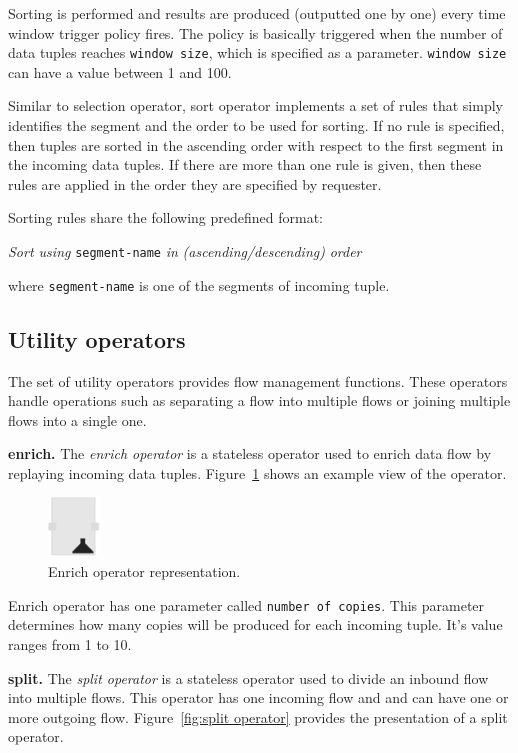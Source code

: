 Sorting is performed and results are produced (outputted one by one) every time 
window trigger policy fires. The policy is basically triggered when the number of 
data tuples reaches \texttt{window size}, which is specified as a parameter. 
\texttt{window size} can have a value between 1 and 100.

Similar to selection operator, sort operator implements a set of rules that simply 
identifies the segment and the order to be used for sorting. If no rule is specified, 
then tuples are sorted in the ascending order with respect to the first segment in 
the incoming data tuples. If there are more than one rule is given, then these rules 
are applied in the order they are specified by requester.

Sorting rules share the following predefined format:

\textit{Sort using} \texttt{segment-name} \textit{in} \textit{(ascending/descending)} \textit{order}

where \texttt{segment-name} is one of the segments of incoming tuple.

\subsection{Utility operators}
\label{sec:utility operators}
The set of utility operators provides flow management functions. These operators 
handle operations such as separating a flow into multiple flows or joining multiple 
flows into a single one.

\textbf{enrich.}
The \textit{enrich operator} is a stateless operator used to enrich data flow by 
replaying incoming data tuples. Figure~\ref{fig:enrich operator} shows an example 
view of the operator.

\begin{figure}[ht]
	\centering
	\includegraphics[height=60px]{figures/EnrichOperator.pdf}
	\caption{Enrich operator representation.}
	\label{fig:enrich operator}
\end{figure}

Enrich operator has one parameter called \texttt{number of copies}. This parameter 
determines how many copies will be produced for each incoming tuple. It's value 
ranges from 1 to 10.

\textbf{split.}
The \textit{split operator} is a stateless operator used to divide an inbound flow 
into multiple flows. This operator has one incoming flow and and can have one or 
more outgoing flow. Figure~\ref{fig:split operator} provides the presentation of a 
split operator.

